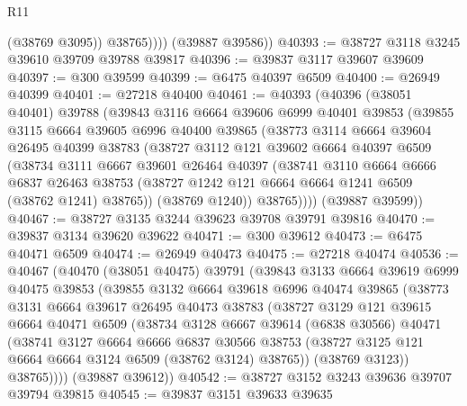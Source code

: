 \begin{lexlean}{R11}
\begin{coremodule}
                (@38769 @3095))
              @38765))))
      (@39887 @39586))
@40393 := @38727 @3118 @3245 @39610 @39709 @39788 @39817
@40396 := @39837 @3117 @39607 @39609
@40397 := @300 @39599
@40399 := @6475 @40397 @6509
@40400 := @26949 @40399
@40401 := @27218 @40400
@40461 := @40393
    (@40396
      (@38051 @40401)
      @39788
      (@39843
        @3116
        @6664
        @39606
        @6999
        @40401
        @39853
        (@39855
          @3115
          @6664
          @39605
          @6996
          @40400
          @39865
          (@38773
            @3114
            @6664
            @39604
            @26495
            @40399
            @38783
            (@38727
              @3112
              @121
              @39602
              @6664
              @40397
              @6509
              (@38734
                @3111
                @6667
                @39601
                @26464
                @40397
                (@38741
                  @3110
                  @6664
                  @6666
                  @6837
                  @26463
                  @38753
                  (@38727 @1242 @121 @6664 @6664 @1241 @6509 (@38762 @1241) @38765))
                (@38769 @1240))
              @38765))))
      (@39887 @39599))
@40467 := @38727 @3135 @3244 @39623 @39708 @39791 @39816
@40470 := @39837 @3134 @39620 @39622
@40471 := @300 @39612
@40473 := @6475 @40471 @6509
@40474 := @26949 @40473
@40475 := @27218 @40474
@40536 := @40467
    (@40470
      (@38051 @40475)
      @39791
      (@39843
        @3133
        @6664
        @39619
        @6999
        @40475
        @39853
        (@39855
          @3132
          @6664
          @39618
          @6996
          @40474
          @39865
          (@38773
            @3131
            @6664
            @39617
            @26495
            @40473
            @38783
            (@38727
              @3129
              @121
              @39615
              @6664
              @40471
              @6509
              (@38734
                @3128
                @6667
                @39614
                (@6838 @30566)
                @40471
                (@38741
                  @3127
                  @6664
                  @6666
                  @6837
                  @30566
                  @38753
                  (@38727 @3125 @121 @6664 @6664 @3124 @6509 (@38762 @3124) @38765))
                (@38769 @3123))
              @38765))))
      (@39887 @39612))
@40542 := @38727 @3152 @3243 @39636 @39707 @39794 @39815
@40545 := @39837 @3151 @39633 @39635

\end{coremodule}
\end{lexlean}
